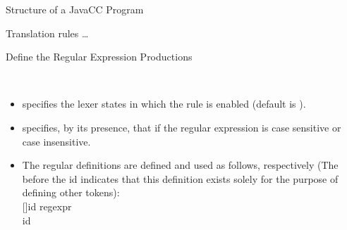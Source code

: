 \begin{bibunit}[apalike]
\begin{frame}[t,fragile]{Structure of a JavaCC Program}
\begin{small}
{\begin{block}{Translation rules}
		\dots
	\end{block}}
	\end{small}
\end{frame}

\begin{frame}{Define the Regular Expression Productions}
	\begin{definition}
		 \\
	\end{definition}
	\begin{itemize}
	\item {} specifies the lexer states in which the rule is enabled (default is ).
	\item {} specifies, by its presence, that if the regular expression is case sensitive or case insensitive.
	\item The regular definitions are defined and used as follows, respectively (The  before the id indicates that this definition exists solely for the purpose of defining other tokens): \\
		\tok{\textless} [\tok{\#}]id \tok{:} regexpr \tok{\textgreater} \\
		\tok{\textless}id\tok{\textgreater}
	\end{itemize}
\end{frame}


\end{bibunit}
